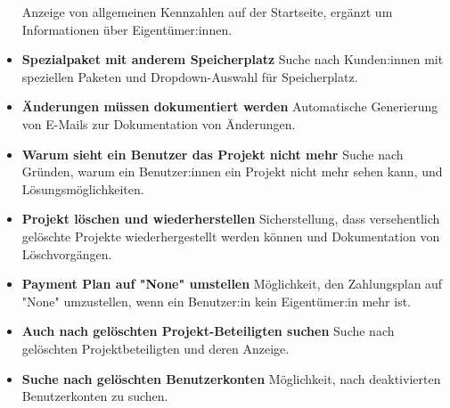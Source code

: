 \begin{itemize}
        \newline
        Anzeige von allgemeinen Kennzahlen auf der Startseite, ergänzt um Informationen über Eigentümer:innen.
    \item \textbf{Spezialpaket mit anderem Speicherplatz}
        \newline
        Suche nach Kunden:innen mit speziellen Paketen und Dropdown-Auswahl für Speicherplatz.
    \item \textbf{Änderungen müssen dokumentiert werden}
        \newline
        Automatische Generierung von E-Mails zur Dokumentation von Änderungen.
    \item \textbf{Warum sieht ein Benutzer das Projekt nicht mehr}
        \newline
        Suche nach Gründen, warum ein Benutzer:innen ein Projekt nicht mehr sehen kann, und Lösungsmöglichkeiten.
    \item \textbf{Projekt löschen und wiederherstellen}
        \newline
        Sicherstellung, dass versehentlich gelöschte Projekte wiederhergestellt werden können und Dokumentation von Löschvorgängen.
    \item \textbf{Payment Plan auf "None" umstellen}
        \newline
        Möglichkeit, den Zahlungsplan auf "None" umzustellen, wenn ein Benutzer:in kein Eigentümer:in mehr ist.
    \item \textbf{Auch nach gelöschten Projekt-Beteiligten suchen}
        \newline
        Suche nach gelöschten Projektbeteiligten und deren Anzeige.
    \item \textbf{Suche nach gelöschten Benutzerkonten}
        \newline
        Möglichkeit, nach deaktivierten Benutzerkonten zu suchen.
\end{itemize}
\newpage